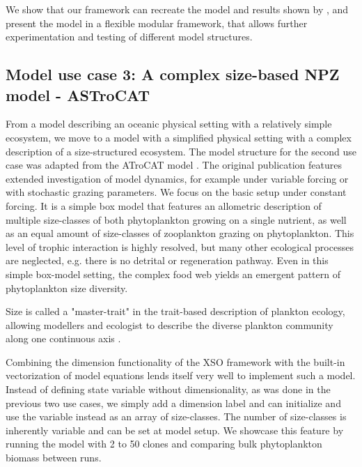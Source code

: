 \documentclass[journal abbreviation, manuscript]{copernicus}
\begin{document}
We show that our framework can recreate the model and results shown by \citet{Anderson2015c}, and present the model in a flexible modular framework, that allows further experimentation and testing of different model structures.


\subsection{Model use case 3: A complex size-based NPZ model - ASTroCAT}

From a model describing an oceanic physical setting with a relatively simple ecosystem, we move to a model with a simplified physical setting with a complex description of a size-structured ecosystem. The model structure for the second use case was adapted from the ATroCAT model \citep{Banas2011b}. The original publication features extended investigation of model dynamics, for example under variable forcing or with stochastic grazing parameters. We focus on the basic setup under constant forcing. It is a simple box model that features an allometric description of multiple size-classes of both phytoplankton growing on a single nutrient, as well as an equal amount of size-classes of zooplankton grazing on phytoplankton. This level of trophic interaction is highly resolved, but many other ecological processes are neglected, e.g. there is no detrital or regeneration pathway. Even in this simple box-model setting, the complex food web yields an emergent pattern of phytoplankton size diversity. 

Size is called a "master-trait" in the trait-based description of plankton ecology, allowing modellers and ecologist to describe the diverse plankton community along one continuous axis \citep{Litchman2008}. 

Combining the dimension functionality of the XSO framework with the built-in vectorization of model equations lends itself very well to implement such a model. Instead of defining state variable without dimensionality, as was done in the previous two use cases, we simply add a dimension label and can initialize and use the variable instead as an array of size-classes. The number of size-classes is inherently variable and can be set at model setup. We showcase this feature by running the model with 2 to 50 clones and comparing bulk phytoplankton biomass between runs.
\end{document}
